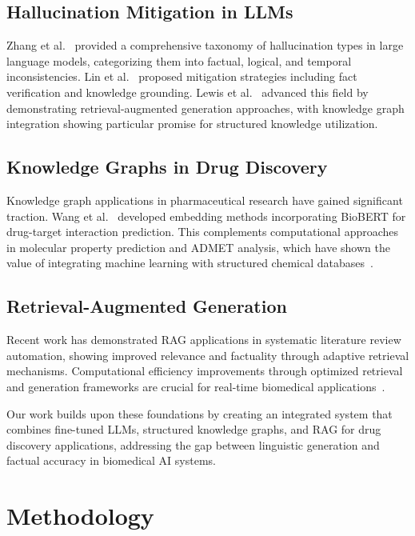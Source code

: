 \documentclass[conference]{IEEEtran}
\begin{document}
\subsection{Hallucination Mitigation in LLMs}

Zhang et al.~\cite{zhang2023survey} provided a comprehensive taxonomy of hallucination types in large language models, categorizing them into factual, logical, and temporal inconsistencies. Lin et al.~\cite{lin2022truthfulqa} proposed mitigation strategies including fact verification and knowledge grounding. Lewis et al.~\cite{lewis2020retrieval} advanced this field by demonstrating retrieval-augmented generation approaches, with knowledge graph integration showing particular promise for structured knowledge utilization.

\subsection{Knowledge Graphs in Drug Discovery}

Knowledge graph applications in pharmaceutical research have gained significant traction. Wang et al.~\cite{wang2019biokg} developed embedding methods incorporating BioBERT for drug-target interaction prediction. This complements computational approaches in molecular property prediction and ADMET analysis, which have shown the value of integrating machine learning with structured chemical databases~\cite{bento2014chembl}.

\subsection{Retrieval-Augmented Generation}

Recent work has demonstrated RAG applications in systematic literature review automation, showing improved relevance and factuality through adaptive retrieval mechanisms. Computational efficiency improvements through optimized retrieval and generation frameworks are crucial for real-time biomedical applications~\cite{shoeybi2019megatron}.

Our work builds upon these foundations by creating an integrated system that combines fine-tuned LLMs, structured knowledge graphs, and RAG for drug discovery applications, addressing the gap between linguistic generation and factual accuracy in biomedical AI systems.

\section{Methodology}
\end{document}
